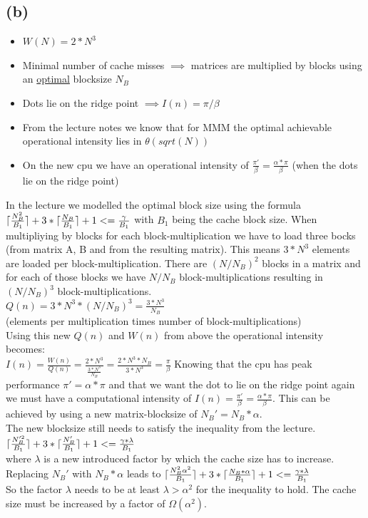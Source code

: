 \documentclass[10pt,a4paper,oneside,notitlepage]{report}
\DeclarePairedDelimiter{\ceil}{\lceil}{\rceil}
\begin{document}
\subsection*{(b)}
\begin{itemize}
\item $W(N) = 2*N^3$
\item Minimal number of cache misses $\implies$ matrices are multiplied by blocks using an \underline{optimal} blocksize $N_B$ 
\item Dots lie on the ridge point $\implies I(n) = \pi/\beta$ 
\item From the lecture notes we know that for MMM the optimal achievable operational intensity lies in $\theta(sqrt(N))$
\item On the new cpu we have an operational intensity of $\frac{\pi'}{\beta}=\frac{\alpha*\pi}{\beta}$ (when the dots lie on the ridge point)
\end{itemize}
In the lecture we modelled the optimal block size using the formula $\ceil{\frac{N_B^2}{B_1}} + 3*\ceil{\frac{N_B}{B_1}} + 1 <= \frac{\gamma}{B_1}$ with $B_1$ being the cache block size. When multipliying by blocks for each block-multiplication we have to load three bocks (from matrix A, B and from the resulting matrix). This means $3*N^3$ elements are loaded per block-multiplication. There are $(N/N_B)^2$ blocks in a matrix and for each of those blocks we have $N/N_B$ block-multiplications resulting in $(N/N_B)^3$ block-multiplications.\\
$Q(n)={3*N^3 * (N/N_B)^3}=\frac{3*N^3}{N_B}$ \\ (elements per multiplication times number of block-multiplications) \\
Using this new $Q(n)$ and $W(n)$ from above the operational intensity becomes: \\ $I(n)=\frac{W(n)}{Q(n)}=\frac{2*N^3}{\frac{3*N^3}{N_B}} = \frac{2*N^3*N_B}{3*N^3} =\frac{\pi}{\beta}$
Knowing that the cpu has peak performance $\pi'=\alpha*\pi$ and that we want the dot to lie on the ridge point again we must have a computational intensity of $I(n)=\frac{\pi'}{\beta} = \frac{\alpha*\pi}{\beta}$. This can be achieved by using a new matrix-blocksize of $N_B'=N_B*\alpha$. \\
The new blocksize still needs to satisfy the inequality from the lecture. \\
$\ceil{\frac{N_B'^2}{B_1}} + 3*\ceil{\frac{N_B'}{B_1}} + 1 <= \frac{\gamma*\lambda}{B_1}$ \\
where $\lambda$ is a new introduced factor by which the cache size has to increase. \\
Replacing $N_B'$ with $N_B*\alpha$ leads to
$\ceil{\frac{N_B^2\alpha^2}{B_1}} + 3*\ceil{\frac{N_B*\alpha}{B_1}} + 1 <= \frac{\gamma*\lambda}{B_1}$ \\
So the factor $\lambda$ needs to be at least $\lambda>\alpha^2$ for the inequality to hold. The cache size must be increased by a factor of $\Omega(\alpha^2)$.
\newpage
\end{document}
